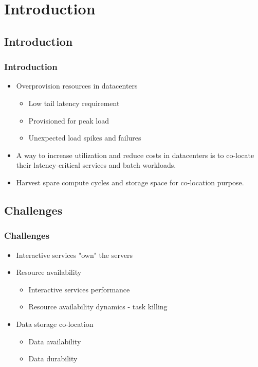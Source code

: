 \documentclass{beamer}
\begin{document}
\section{Introduction}

\subsection{Introduction}
    \begin{frame}
    \frametitle{Introduction}
		\begin{itemize}
		\item Overprovision resources in datacenters
			\begin{itemize}
			\item Low tail latency requirement
			\item Provisioned for peak load
			\item Unexpected load spikes and failures
			\end{itemize}
		\item A way to increase utilization and reduce costs in datacenters is to co-locate their latency-critical services and batch workloads.
		\item Harvest spare compute cycles and storage space for co-location purpose.
		\end{itemize}
    \end{frame}

\subsection{Challenges}
	\begin{frame}
	\frametitle{Challenges}
		\begin{itemize}
		\item Interactive services "own" the servers
		\item Resource availability
			\begin{itemize}
			\item Interactive services performance
			\item Resource availability dynamics - task killing
			\end{itemize}
		\item Data storage co-location
			\begin{itemize}
			\item Data availability
			\item Data durability
			\end{itemize}
		\end{itemize}
	\end{frame}
\end{document}
